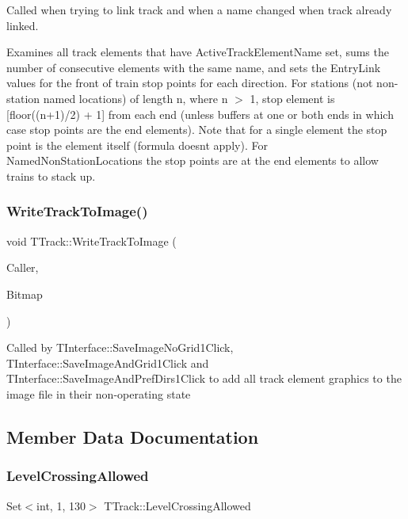 Called when trying to link track and when a name changed when track already linked.

Examines all track elements that have Active\+Track\+Element\+Name set, sums the number of consecutive elements with the same name, and sets the Entry\+Link values for the front of train stop points for each direction. For stations (not non-\/station named locations) of length n, where n $>$ 1, stop element is \mbox{[}floor((n+1)/2) + 1\mbox{]} from each end (unless buffers at one or both ends in which case stop points are the end elements). Note that for a single element the stop point is the element itself (formula doesn\textquotesingle{}t apply). For Named\+Non\+Station\+Locations the stop points are at the end elements to allow trains to stack up. \mbox{\label{class_t_track_ab3530b4af2a4b2a9cd1c1b480a19298d}} 
\subsubsection{\texorpdfstring{Write\+Track\+To\+Image()}{WriteTrackToImage()}}
{\footnotesize\ttfamily void T\+Track\+::\+Write\+Track\+To\+Image (\begin{DoxyParamCaption}\item[{int}]{Caller,  }\item[{Graphics\+::\+T\+Bitmap $\ast$}]{Bitmap }\end{DoxyParamCaption})}

Called by T\+Interface\+::\+Save\+Image\+No\+Grid1\+Click, T\+Interface\+::\+Save\+Image\+And\+Grid1\+Click and T\+Interface\+::\+Save\+Image\+And\+Pref\+Dirs1\+Click to add all track element graphics to the image file in their non-\/operating state 

\subsection{Member Data Documentation}
\mbox{\label{class_t_track_a29617e6f88e44a7974dc08a371682d0b}} 
\subsubsection{\texorpdfstring{Level\+Crossing\+Allowed}{LevelCrossingAllowed}}
{\footnotesize\ttfamily Set$<$int, 1, 130$>$ T\+Track\+::\+Level\+Crossing\+Allowed\hspace{0.3cm}{\ttfamily [private]}}

